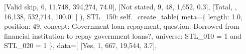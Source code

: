 \documentclass[
  11pt,
  a4paper,
]{article}
\newenvironment{Shaded}{\begin{snugshade}}{\end{snugshade}}
\newcommand{\NormalTok}[1]{\textcolor[rgb]{0.00,0.23,0.31}{#1}}
\newcommand{\OperatorTok}[1]{\textcolor[rgb]{0.37,0.37,0.37}{#1}}
\newcommand{\StringTok}[1]{\textcolor[rgb]{0.13,0.47,0.30}{#1}}
\newcommand{\VariableTok}[1]{\textcolor[rgb]{0.07,0.07,0.07}{#1}}
\begin{document}
\begin{Shaded}
\begin{Highlighting}[]
\NormalTok{                [}\StringTok{\textquotesingle{}Valid skip\textquotesingle{}}\NormalTok{, }\StringTok{\textquotesingle{}6\textquotesingle{}}\NormalTok{, }\StringTok{\textquotesingle{}11,748\textquotesingle{}}\NormalTok{, }\StringTok{\textquotesingle{}394,274\textquotesingle{}}\NormalTok{, }\StringTok{\textquotesingle{}74.0\textquotesingle{}}\NormalTok{],}
\NormalTok{                [}\StringTok{\textquotesingle{}Not stated\textquotesingle{}}\NormalTok{, }\StringTok{\textquotesingle{}9\textquotesingle{}}\NormalTok{, }\StringTok{\textquotesingle{}48\textquotesingle{}}\NormalTok{, }\StringTok{\textquotesingle{}1,652\textquotesingle{}}\NormalTok{, }\StringTok{\textquotesingle{}0.3\textquotesingle{}}\NormalTok{],}
\NormalTok{                [}\StringTok{\textquotesingle{}Total\textquotesingle{}}\NormalTok{, }\StringTok{\textquotesingle{}\textquotesingle{}}\NormalTok{, }\StringTok{\textquotesingle{}16,138\textquotesingle{}}\NormalTok{, }\StringTok{\textquotesingle{}532,714\textquotesingle{}}\NormalTok{, }\StringTok{\textquotesingle{}100.0\textquotesingle{}}\NormalTok{]}
\NormalTok{                ]}
\NormalTok{            ),        }
            \StringTok{\textquotesingle{}STL\_150\textquotesingle{}}\NormalTok{: }\VariableTok{self}\NormalTok{.\_create\_table(}
\NormalTok{                meta}\OperatorTok{=}\NormalTok{\{}
                    \StringTok{\textquotesingle{}length\textquotesingle{}}\NormalTok{: }\StringTok{\textquotesingle{}1.0\textquotesingle{}}\NormalTok{, }\StringTok{\textquotesingle{}position\textquotesingle{}}\NormalTok{: }\StringTok{\textquotesingle{}49\textquotesingle{}}\NormalTok{,}
                    \StringTok{\textquotesingle{}concept\textquotesingle{}}\NormalTok{: }\StringTok{\textquotesingle{}Government loan repayment\textquotesingle{}}\NormalTok{,}
                    \StringTok{\textquotesingle{}question\textquotesingle{}}\NormalTok{: }\StringTok{\textquotesingle{}Borrowed from financial institution to repay government loans?\textquotesingle{}}\NormalTok{,}
                    \StringTok{\textquotesingle{}universe\textquotesingle{}}\NormalTok{: }\StringTok{\textquotesingle{}STL\_010 = 1 and STL\_020 = 1\textquotesingle{}}
\NormalTok{                \},}
\NormalTok{                data}\OperatorTok{=}\NormalTok{[}
\NormalTok{                    [}\StringTok{\textquotesingle{}Yes\textquotesingle{}}\NormalTok{, }\StringTok{\textquotesingle{}1\textquotesingle{}}\NormalTok{, }\StringTok{\textquotesingle{}667\textquotesingle{}}\NormalTok{, }\StringTok{\textquotesingle{}19,544\textquotesingle{}}\NormalTok{, }\StringTok{\textquotesingle{}3.7\textquotesingle{}}\NormalTok{],}

\end{Highlighting}
\end{Shaded}
\end{document}
